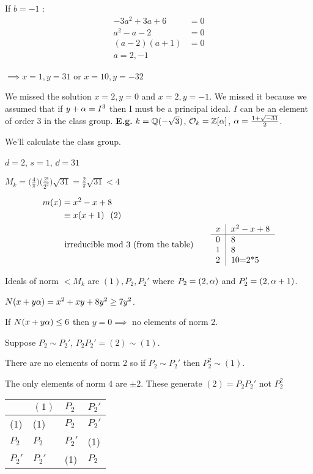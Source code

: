 \documentclass[11pt]{article}
\begin{document}
If $b=-1$ : 
\begin{align*}
	-3a^2 + 3a+6&=0\\
	a^2-a-2 &= 0\\
	(a-2)(a+1) &= 0 \\
	a=2,-1
\end{align*}

$\implies x=1,y=31$ or $x=10,y=-32$
\spa

We missed the solution $x = 2, y= 0 $ and $x=2, y=-1$. 
We missed it because we assumed that if $y+\alpha = I^3$ then I must be a principal ideal.
$I$ can be an element of order 3 in the class group.
\spac
\textbf{E.g.} $k = \mathbb{Q}(-\sqrt{3} )$, $\mathcal{O}_k = \mathbb{Z}[\alpha]$, $\alpha = \frac{1+\sqrt{-31}}2$. 

We'll calculate the class group.

$d = 2$, $s=1$, $\dd=31$
\spa

$M_k = \big(\frac4\pi\big)\big(\frac{2!}{2^2}\big) \sqrt{31} = \frac2\pi\sqrt{31} < 4$


\begin{align*}
	m(x) &= x^2-x+8\\
	&\equiv x(x+1) \hspace{7pt} (2)    \\
	&\text{ irreducible mod 3 (from the table)}
	&&&\begin{tabular}{l|l}
		$x$ & $x^2-x+8$ \\ \hline
		0   & 8         \\
		1   & 8         \\
		2   & 10=2*5   
	\end{tabular}
\end{align*}

Ideals of norm $<M_k$ are $(1), P_2, P_2'$ where $P_2 = (2,\alpha) $ and $P_2' = (2, \alpha+1)$.
\spa

$N(x+y\alpha) = x^2 + xy+ 8y^2 \geq 7y^2$.
\spa

If $N(x+y\alpha) \leq 6$ then $y=0 \implies $ no elements of norm 2.
\spa

Suppose $P_2 \sim P_2'$, $P_2P_2' = (2) \sim (1)$.
\spa

There are no elements of norm 2 so if $P_2 \sim P_2' $ then $P_2^2 \sim (1)$.
\spa

The only elements of norm 4 are $\pm 2$.
These generate $(2) = P_2P_2'$ not $P_2^2$ 


\begin{tabular}{l|lll}
	& $(1)$ & $P_2$ &$P_2'$ \\ \hline
	(1) & (1) & $P_2$ & $P_2'$ \\
	$P_2$ & $P_2$ & $P_2'$ &(1)\\
	$P_2'$ & $P_2'$ &(1) & $P_2$
\end{tabular}
\end{document}
